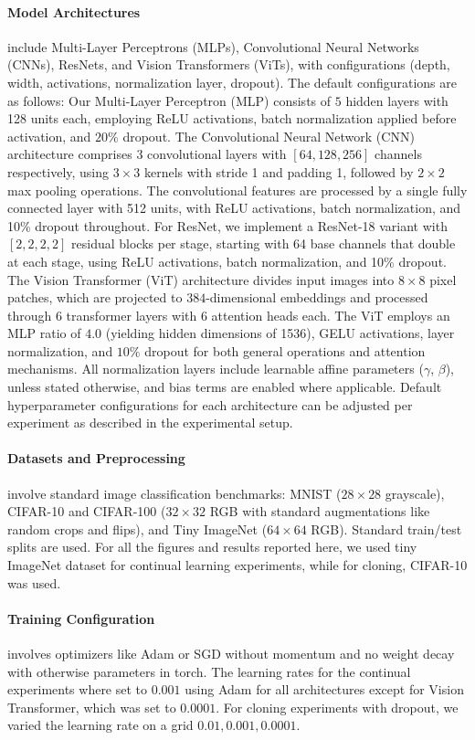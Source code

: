 \documentclass{article}
\numberwithin{figure}{section}
\begin{document}
\paragraph{Model Architectures} include Multi-Layer Perceptrons (MLPs), Convolutional Neural Networks (CNNs), ResNets, and Vision Transformers (ViTs), with configurations (depth, width, activations, normalization layer, dropout). The default configurations are as follows:
Our Multi-Layer Perceptron (MLP) consists of $5$ hidden layers with 128 units each, employing ReLU activations, batch normalization applied before activation, and $20\%$ dropout. The Convolutional Neural Network (CNN) architecture comprises 3 convolutional layers with $[64, 128, 256]$ channels respectively, using $3\times3$ kernels with stride 1 and padding 1, followed by $2\times2$ max pooling operations. The convolutional features are processed by a single fully connected layer with 512 units, with ReLU activations, batch normalization, and 10\% dropout throughout. For ResNet, we implement a ResNet-18 variant with $[2, 2, 2, 2]$ residual blocks per stage, starting with 64 base channels that double at each stage, using ReLU activations, batch normalization, and 10\% dropout. The Vision Transformer (ViT) architecture divides input images into $8\times8$ pixel patches, which are projected to $384$-dimensional embeddings and processed through $6$ transformer layers with $6$ attention heads each. The ViT employs an MLP ratio of $4.0$ (yielding hidden dimensions of 1536), GELU activations, layer normalization, and $10\%$ dropout for both general operations and attention mechanisms. All normalization layers include learnable affine parameters ($\gamma$, $\beta$), unless stated otherwise, and bias terms are enabled where applicable. Default hyperparameter configurations for each architecture can be adjusted per experiment as described in the experimental setup.
\paragraph{Datasets and Preprocessing} involve standard image classification benchmarks: MNIST ($28 \times 28$ grayscale), CIFAR-10 and CIFAR-100 ($32 \times 32$ RGB with standard augmentations like random crops and flips), and Tiny ImageNet ($64 \times 64$ RGB). Standard train/test splits are used. For all the figures and results reported here, we used tiny ImageNet dataset for continual learning experiments, while for cloning, CIFAR-10 was used.  
\paragraph{Training Configuration} involves optimizers like Adam or SGD without momentum and no weight decay with otherwise parameters in torch. The learning rates for the continual experiments where set to $0.001$ using Adam for all architectures except for Vision Transformer, which was set to $0.0001.$ For cloning experiments with dropout, we varied the learning rate on a grid $0.01, 0.001, 0.0001.$
\end{document}
